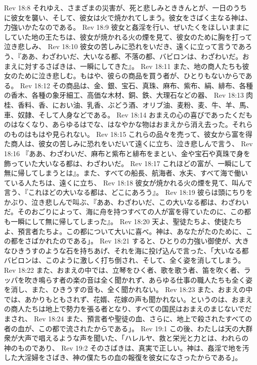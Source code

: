Rev 18:8  それゆえ、さまざまの災害が、死と悲しみとききんとが、一日のうちに彼女を襲い、そして、彼女は火で焼かれてしまう。彼女をさばく主なる神は、力強いかたなのである。
Rev 18:9  彼女と姦淫を行い、ぜいたくをほしいままにしていた地の王たちは、彼女が焼かれる火の煙を見て、彼女のために胸を打って泣き悲しみ、
Rev 18:10  彼女の苦しみに恐れをいだき、遠くに立って言うであろう、『ああ、わざわいだ、大いなる都、不落の都、バビロンは、わざわいだ。おまえに対するさばきは、一瞬にしてきた』。
Rev 18:11  また、地の商人たちも彼女のために泣き悲しむ。もはや、彼らの商品を買う者が、ひとりもないからである。
Rev 18:12  その商品は、金、銀、宝石、真珠、麻布、紫布、絹、緋布、各種の香木、各種の象牙細工、高価な木材、銅、鉄、大理石などの器、
Rev 18:13  肉桂、香料、香、におい油、乳香、ぶどう酒、オリブ油、麦粉、麦、牛、羊、馬、車、奴隷、そして人身などである。
Rev 18:14  おまえの心の喜びであったくだものはなくなり、あらゆるはでな、はなやかな物はおまえから消え去った。それらのものはもはや見られない。
Rev 18:15  これらの品々を売って、彼女から富を得た商人は、彼女の苦しみに恐れをいだいて遠くに立ち、泣き悲しんで言う、
Rev 18:16  『ああ、わざわいだ、麻布と紫布と緋布をまとい、金や宝石や真珠で身を飾っていた大いなる都は、わざわいだ。
Rev 18:17  これほどの富が、一瞬にして無に帰してしまうとは』。また、すべての船長、航海者、水夫、すべて海で働いている人たちは、遠くに立ち、
Rev 18:18  彼女が焼かれる火の煙を見て、叫んで言う、『これほどの大いなる都は、どこにあろう』。
Rev 18:19  彼らは頭にちりをかぶり、泣き悲しんで叫ぶ、『ああ、わざわいだ、この大いなる都は、わざわいだ。そのおごりによって、海に舟を持つすべての人が富を得ていたのに、この都も一瞬にして無に帰してしまった』。
Rev 18:20  天よ、聖徒たちよ、使徒たちよ、預言者たちよ。この都について大いに喜べ。神は、あなたがたのために、この都をさばかれたのである」。
Rev 18:21  すると、ひとりの力強い御使が、大きなひきうすのような石を持ちあげ、それを海に投げ込んで言った、「大いなる都バビロンは、このように激しく打ち倒され、そして、全く姿を消してしまう。
Rev 18:22  また、おまえの中では、立琴をひく者、歌を歌う者、笛を吹く者、ラッパを吹き鳴らす者の楽の音は全く聞かれず、あらゆる仕事の職人たちも全く姿を消し、また、ひきうすの音も、全く聞かれない。
Rev 18:23  また、おまえの中では、あかりもともされず、花婿、花嫁の声も聞かれない。というのは、おまえの商人たちは地上で勢力を張る者となり、すべての国民はおまえのまじないでだまされ、
Rev 18:24  また、預言者や聖徒の血、さらに、地上で殺されたすべての者の血が、この都で流されたからである」。
Rev 19:1  この後、わたしは天の大群衆が大声で唱えるような声を聞いた、「ハレルヤ、救と栄光と力とは、われらの神のものであり、
Rev 19:2  そのさばきは、真実で正しい。神は、姦淫で地を汚した大淫婦をさばき、神の僕たちの血の報復を彼女になさったからである」。
